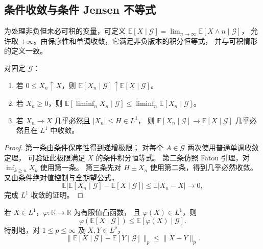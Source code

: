 \documentclass[UTF8,12pt,a4paper,fontset=fandol]{ctexart}
\begin{document}
\subsection{条件收敛与条件 Jensen 不等式}

为处理非负但未必可积的变量，可定义
$\mathbb E[X\mid\mathcal G]=\lim_{n\to\infty}\mathbb E[X\wedge n\mid\mathcal G]$，
允许取 $+\infty$。由保序性和单调收敛，它满足非负版本的积分恒等式，
并与可积情形的定义一致。

\begin{proposition}[条件版本的收敛定理]
\label{prop:conditional-convergence}
对固定 $\mathcal G$：
\begin{enumerate}
  \item 若 $0\leq X_n\uparrow X$，则
    $\mathbb E[X_n\mid\mathcal G]\uparrow\mathbb E[X\mid\mathcal G]$。
  \item 若 $X_n\geq0$，则
    $\mathbb E[\liminf_nX_n\mid\mathcal G]
      \leq\liminf_n\mathbb E[X_n\mid\mathcal G]$。
  \item 若 $X_n\to X$ 几乎必然且 $|X_n|\leq H\in L^1$，
    则 $\mathbb E[X_n\mid\mathcal G]\to\mathbb E[X\mid\mathcal G]$
    几乎必然且在 $L^1$ 中收敛。
\end{enumerate}
\end{proposition}

\begin{proof}
第一条由条件保序性得到递增极限；
对每个 $A\in\mathcal G$ 两次使用普通单调收敛定理，
可验证此极限满足 $X$ 的条件积分恒等式。
第二条仿照 Fatou 引理，对 $\inf_{k\geq n}X_k$ 使用第一条。
第三条先对 $H\pm X_n$ 使用第二条，得到几乎必然收敛。
又由条件绝对值控制与全期望公式，
\[
  \mathbb E|\mathbb E[X_n\mid\mathcal G]-\mathbb E[X\mid\mathcal G]|
  \leq\mathbb E|X_n-X|\longrightarrow0,
\]
完成 $L^1$ 收敛的证明。
\end{proof}

\begin{theorem}
\label{thm:conditional-jensen}
若 $X\in L^1$，$\varphi:\mathbb R\to\mathbb R$ 为有限值凸函数，
且 $\varphi(X)\in L^1$，则
\begin{equation}
  \varphi(\mathbb E[X\mid\mathcal G])
  \leq\mathbb E[\varphi(X)\mid\mathcal G].
  \label{eq:conditional-jensen}
\end{equation}
特别地，对 $1\leq p\leq\infty$ 及 $X,Y\in L^p$，
\begin{equation}
  \|\mathbb E[X\mid\mathcal G]-\mathbb E[Y\mid\mathcal G]\|_p
  \leq\|X-Y\|_p.
  \label{eq:conditional-contraction}
\end{equation}
\end{theorem}
\end{document}
